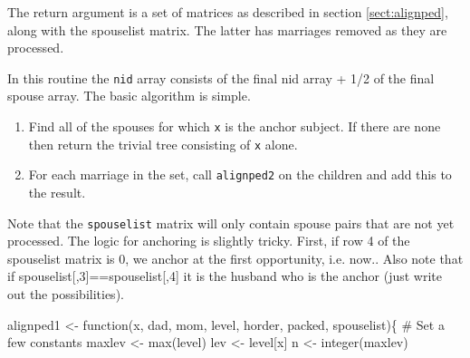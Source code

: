 \documentclass{article}
\begin{document}
\begin{enumerate}
The return argument is a set of matrices as described in 
section \ref{sect:alignped}, along with the spouselist matrix.
The latter has marriages removed as they are processed.

In this routine the {\tt{}nid} array consists of the final nid array + 1/2 of the
final spouse array.
The basic algorithm is simple.  
\begin{enumerate}
  \item Find all of the spouses for which {\tt{}x} is the anchor subject.  If
    there are none then return the trivial tree consisting of {\tt{}x} alone.
  \item For each marriage in the set, call {\tt{}alignped2} on the children
    and add this to the result.
\end{enumerate}
Note that the {\tt{}spouselist} matrix will only contain spouse pairs that
are not yet processed.
The logic for anchoring is slightly tricky.  First, if row 4 of
the spouselist matrix is 0, we anchor at the first opportunity, i.e. now..
Also note that if spouselist[,3]==spouselist[,4] it is
the husband who is the anchor (just write out the possibilities).

\nwenddocs{}\endmoddef
alignped1 <- function(x, dad, mom, level, horder, packed, spouselist)\{
    # Set a few constants
    maxlev <- max(level)
    lev <- level[x]
    n <- integer(maxlev)


\end{enumerate}
\end{document}
